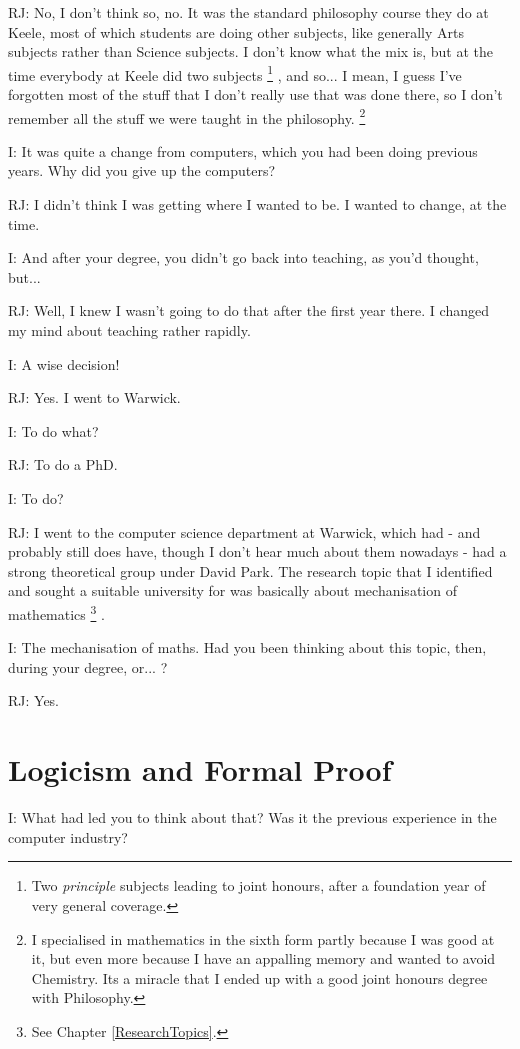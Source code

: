 \documentclass[10pt,titlepage]{book}
\begin{document}
RJ: No, I don't think so, no. It was the standard philosophy course they do at Keele, most of which students are doing other subjects, like generally Arts subjects rather than Science subjects.
I don't know what the mix is, but at the time everybody at Keele did two subjects%
\footnote{
Two {\it principle} subjects leading to joint honours, after a foundation year of very general coverage.}%
, and so... I mean, I guess I've forgotten most of the stuff that I don't really use that was done there, so I don't remember all the stuff we were taught in the philosophy.%
\footnote{I specialised in mathematics in the sixth form partly because I was good at it, but even more because I have an appalling memory and wanted to avoid Chemistry.
Its a miracle that I ended up with a good joint honours degree with Philosophy.}

I: It was quite a change from computers, which you had been doing previous years. Why did you give up the computers?

RJ: I didn't think I was getting where I wanted to be. I wanted to change, at the time.

I: And after your degree, you didn't go back into teaching, as you'd thought, but...

RJ: Well, I knew I wasn't going to do that after the first year there. I changed my mind about teaching rather rapidly.

I: A wise decision!

RJ: Yes. I went to Warwick.

I: To do what?

RJ: To do a PhD.

I: To do?

RJ: I went to the computer science department at Warwick, which had - and probably still does have, though I don't hear much about them nowadays - had a strong theoretical group under David Park. The research topic that I identified and sought a suitable university for was basically about mechanisation of mathematics%
\footnote{
See Chapter \ref{ResearchTopics}.}%
.

I: The mechanisation of maths. Had you been thinking about this topic, then, during your degree, or... ?

RJ: Yes.

\section{Logicism and Formal Proof}

I: What had led you to think about that? Was it the previous experience in the computer industry?
\end{document}
